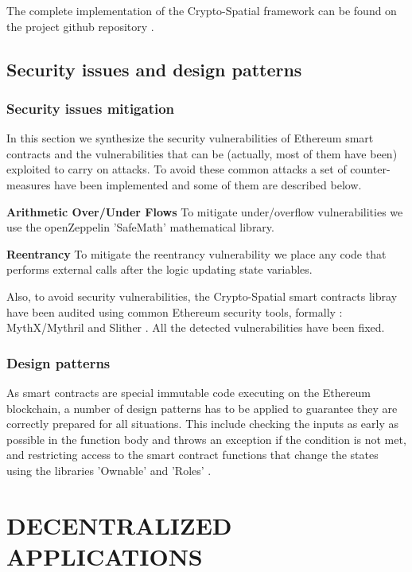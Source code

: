 \documentclass{isprs} %
\begin{document}
The complete implementation of the Crypto-Spatial framework can be found on the project github repository \cite{github_allilou_dela}.\\

\subsection{Security issues and design patterns}\label{sec:Security issues and design patterns}

\subsubsection{Security issues mitigation}\label{sec:Security issues mitigation}

In this section we synthesize the security vulnerabilities of Ethereum smart contracts and the vulnerabilities that can be (actually, most of them have been) exploited to carry on attacks. To avoid these common attacks a set of counter-measures have been implemented and some of them are described below.

\textbf{Arithmetic Over/Under Flows}  To mitigate under/overflow vulnerabilities we use the openZeppelin 'SafeMath' mathematical library. 

\textbf{Reentrancy} To mitigate the reentrancy vulnerability we place any code that performs external calls after the logic updating state variables. 

Also, to avoid security vulnerabilities, the Crypto-Spatial smart contracts libray have been audited using common Ethereum security tools, formally : MythX/Mythril \cite{mythx} and Slither \cite{slihter}. All the detected vulnerabilities have been fixed.

\subsubsection{Design patterns}\label{sec:Design patterns}

As smart contracts are special immutable code executing on the Ethereum blockchain, a number of design patterns has to be applied to guarantee they are correctly prepared for all situations. This include checking the inputs as early as possible in the function body and throws an exception if the condition is not met, and restricting access to the smart contract functions that change the states using the \cite{openzeppelin} libraries 'Ownable' and 'Roles' .

\newpage
\section{DECENTRALIZED APPLICATIONS}\label{sec:DECENTRALIZED APPLICATIONS}
\end{document}
